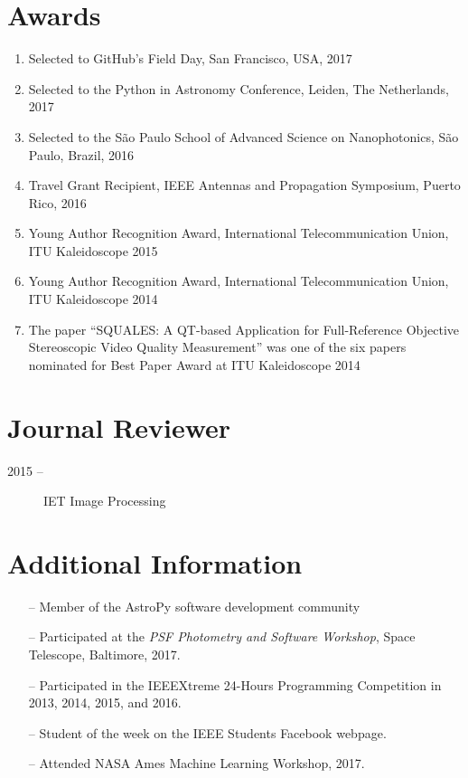 \documentclass[10pt]{article}
\begin{document}
\begin{titlepage}
\section{Awards}
\begin{enumerate}
  \item Selected to GitHub's Field Day, San Francisco, USA, 2017
  \item Selected to the Python in Astronomy Conference, Leiden, The Netherlands, 2017
  \item Selected to the S\~ao Paulo School of Advanced Science on Nanophotonics, S\~ao Paulo, Brazil, 2016
  \item Travel Grant Recipient, IEEE Antennas and Propagation Symposium, Puerto Rico, 2016
  \item Young Author Recognition Award, International Telecommunication Union, ITU Kaleidoscope 2015
  \item Young Author Recognition Award, International Telecommunication Union, ITU Kaleidoscope 2014
  \item The paper ``SQUALES: A QT-based Application for Full-Reference Objective Stereoscopic Video Quality Measurement'' was one of the six papers nominated for Best Paper Award at ITU Kaleidoscope 2014
\end{enumerate}

\section{Journal Reviewer}

\begin{description}
    \item[2015 --] IET Image Processing
\end{description}

\section{Additional Information}
\begin{itemize}
    \item[--] Member of the AstroPy software development community
    \item[--] Participated at the \textit{PSF Photometry and Software Workshop}, Space Telescope, Baltimore, 2017.
    \item[--] Participated in the IEEEXtreme 24-Hours Programming Competition in 2013, 2014, 2015, and 2016.
    \item[--] Student of the week on the IEEE Students Facebook webpage.
    \item[--] Attended NASA Ames Machine Learning Workshop, 2017.
\end{itemize}

\end{titlepage}
\end{document}
